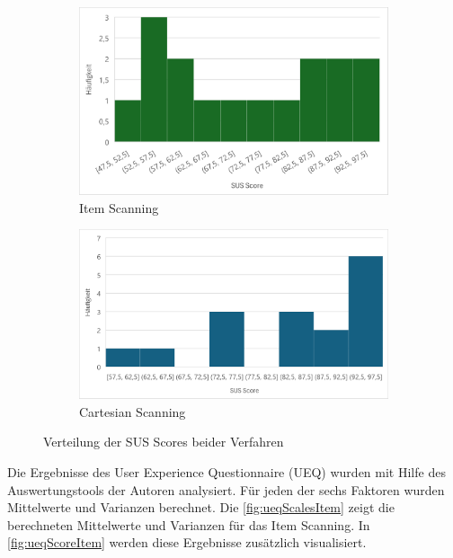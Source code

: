 \begin{figure}
    \centering
    \begin{subfigure} {.5\textwidth}
        \centering
        \includegraphics[width=.95\linewidth]{images/Results/Histogramm-SUS-Item.png}
        \caption{Item Scanning}
        \label{fig:histoSUSItem}
       \end{subfigure}%
       \begin{subfigure}{.5\textwidth}
        \centering
       \includegraphics[width=.98\linewidth]{images/Results/Histogramm-SUS-Cartesian.png}
        \caption{Cartesian Scanning}
        \label{fig:histoSUSCartesian}
       \end{subfigure}
       \caption{Verteilung der SUS Scores beider Verfahren}
       \label{fig:histoSUS}
\end{figure}


Die Ergebnisse des User Experience Questionnaire (UEQ) wurden mit Hilfe des Auswertungstools der Autoren analysiert. Für jeden der sechs Faktoren wurden Mittelwerte und Varianzen berechnet. Die \autoref{fig:ueqScalesItem} zeigt die berechneten Mittelwerte und Varianzen für das Item Scanning. In \autoref{fig:ueqScoreItem} werden diese Ergebnisse zusätzlich visualisiert. 

